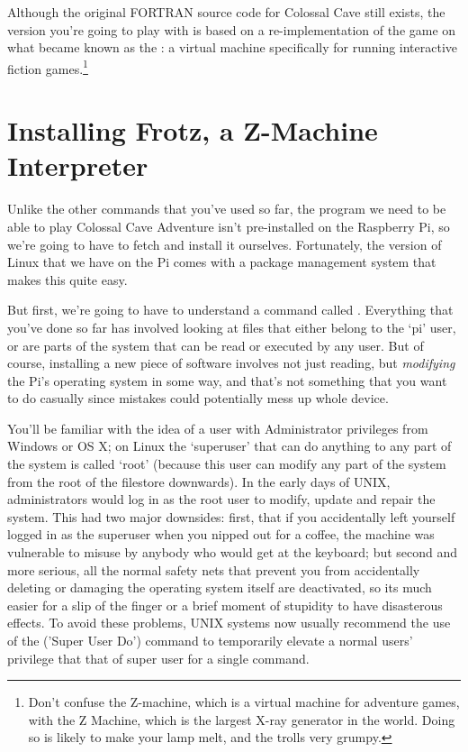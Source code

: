Although the original FORTRAN source code for Colossal Cave still exists, the version you're going to play with is based on a re-implementation of the game on what became known as the : a virtual machine specifically for running interactive fiction games.\footnote{Don't confuse the Z-machine, which is a virtual machine for adventure games, with the Z Machine, which is the largest X-ray generator in the world. Doing so is likely to make your lamp melt, and the trolls very grumpy.}
 
\FloatBarrier
\section{Installing Frotz, a Z-Machine Interpreter}

Unlike the other commands that you've used so far, the program we need to be able to play Colossal Cave Adventure isn't pre-installed on the Raspberry Pi, so we're going to have to fetch and install it ourselves. Fortunately, the version of Linux that we have on the Pi comes with a package management system that makes this quite easy. 

But first, we're going to have to understand a command called . Everything that you've done so far has involved looking at files that either belong to the `pi' user, or are parts of the system that can be read or executed by any user. But of course, installing a new piece of software involves not just reading, but \textit{modifying} the Pi's operating system in some way, and that's not something that you want to do casually since mistakes could potentially mess up whole device. 

You'll be familiar with the idea of a user with Administrator privileges from Windows or OS X; on Linux the `superuser' that can do anything to any part of the system is called `root' (because this user can modify any part of the system from the root of the filestore downwards). In the early days of UNIX, administrators would log in as the root user to modify, update and repair the system. This had two major downsides: first, that if you accidentally left yourself logged in as the superuser when you nipped out for a coffee, the machine was vulnerable to misuse by anybody who would get at the keyboard; but second and more serious, all the normal safety nets that prevent you from accidentally deleting or damaging the operating system itself are deactivated, so its much easier for a slip of the finger or a brief moment of stupidity to have disasterous effects. To avoid these problems, UNIX systems now usually recommend the use of the  ('Super User Do') command to temporarily elevate a normal users' privilege that that of super user for a single command. 

